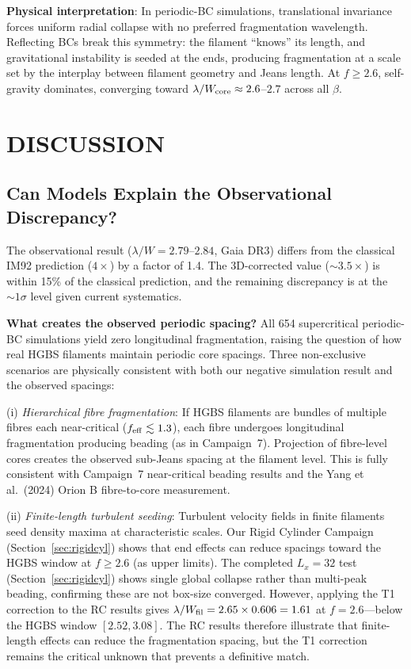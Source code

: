 \documentclass[twoside,twocolumn]{mnras}
\begin{document}
\textbf{Physical interpretation}: In periodic-BC simulations, translational invariance
forces uniform radial collapse with no preferred fragmentation wavelength. Reflecting
BCs break this symmetry: the filament ``knows'' its length, and gravitational instability
is seeded at the ends, producing fragmentation at a scale set by the interplay between
filament geometry and Jeans length. At $f \geq 2.6$, self-gravity dominates, converging
toward $\lambda/W_{\rm core} \approx 2.6$--$2.7$ across all $\beta$.

\section{DISCUSSION}
\label{sec:discussion}

\subsection{Can Models Explain the Observational Discrepancy?}

The observational result ($\lambda/W = 2.79$--$2.84$, Gaia DR3) differs from the classical
IM92 prediction ($4\times$) by a factor of 1.4. The 3D-corrected value (${\sim}3.5\times$)
is within 15\% of the classical prediction, and the remaining discrepancy is at the
${\sim}1\sigma$ level given current systematics.

\textbf{What creates the observed periodic spacing?} All 654 supercritical periodic-BC
simulations yield zero longitudinal fragmentation, raising the question of how real HGBS
filaments maintain periodic core spacings. Three non-exclusive scenarios are physically
consistent with both our negative simulation result and the observed spacings:

(i) \textit{Hierarchical fibre fragmentation}: If HGBS filaments are bundles of multiple
fibres each near-critical ($f_{\rm eff} \lesssim 1.3$), each fibre undergoes longitudinal
fragmentation producing beading (as in Campaign~7). Projection of fibre-level cores creates
the observed sub-Jeans spacing at the filament level. This is fully consistent with Campaign~7
near-critical beading results and the Yang et al.\ (2024) Orion B fibre-to-core measurement.

(ii) \textit{Finite-length turbulent seeding}: Turbulent velocity fields in finite
filaments seed density maxima at characteristic scales. Our Rigid Cylinder Campaign
(Section~\ref{sec:rigidcyl}) shows that end effects can reduce spacings toward the HGBS window at $f \geq 2.6$ (as upper limits). The completed $L_x = 32$ test (Section~\ref{sec:rigidcyl}) shows single global collapse rather than multi-peak beading, confirming these are not box-size converged. However, applying the T1 correction to the
RC results gives $\lambda/W_{\rm fil} = 2.65 \times 0.606 = 1.61$ at $f = 2.6$---below
the HGBS window $[2.52, 3.08]$. The RC results therefore illustrate that finite-length
effects can reduce the fragmentation spacing, but the T1 correction remains the critical
unknown that prevents a definitive match.
\end{document}
